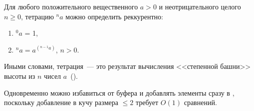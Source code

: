 \begin{definition}
Для любого положительного вещественного $a > 0$ и неотрицательного целого $n \geq 0$,
тетрацию ${}^na$ можно определить реккурентно:
\begin{enumerate}
\item ${}^0a$ = 1,
\item ${}^na = a^{({}^{n-1}a)}$, $n > 0$.
\end{enumerate}
Иными словами, тетрация~--- это результат вычисления <<степенной башни>> высоты из $n$
чисел $a$~(\cite{tetration}).
\end{definition}

Одновременно можно избавиться от буфера и добавлять элементы сразу в \MH[1], поскольку
добавление в кучу размера $\leq 2$ требует $O(1)$ сравнений.
